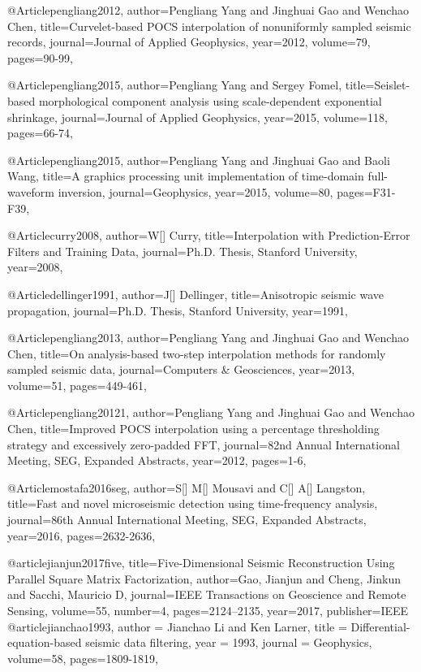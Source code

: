 {@Article{pengliang2012,
  author={Pengliang Yang and Jinghuai Gao and Wenchao Chen},
  title={Curvelet-based {POCS} interpolation of nonuniformly sampled seismic records},
  journal={Journal of Applied Geophysics},
  year=2012,
  volume=79,
  pages={90-99},
}

@Article{pengliang2015,
  author={Pengliang Yang and Sergey Fomel},
  title={Seislet-based morphological component analysis using scale-dependent exponential shrinkage},
  journal={Journal of Applied Geophysics},
  year=2015,
  volume=118,
  pages={66-74},
}

@Article{pengliang2015,
  author={Pengliang Yang and Jinghuai Gao and Baoli Wang},
  title={A graphics processing unit implementation of time-domain full-waveform inversion},
  journal={Geophysics},
  year=2015,
  volume=80,
  pages={F31-F39},
}

@Article{curry2008,
  author={W[] Curry},
  title={Interpolation with Prediction-Error Filters and Training Data},
  journal={Ph.D. Thesis, Stanford University},
  year=2008,
}

@Article{dellinger1991,
  author={J[] Dellinger},
  title={Anisotropic seismic wave propagation},
  journal={Ph.D. Thesis, Stanford University},
  year=1991,
}

@Article{pengliang2013,
  author={Pengliang Yang and Jinghuai Gao and Wenchao Chen},
  title={On analysis-based two-step interpolation methods for randomly sampled seismic data},
  journal={Computers \& Geosciences},
  year=2013,
  volume=51,
  pages={449-461},
}

@Article{pengliang20121,
  author={Pengliang Yang and Jinghuai Gao and Wenchao Chen},
  title={Improved {POCS} interpolation using a percentage thresholding strategy and excessively zero-padded FFT},
  journal={82nd Annual International Meeting, SEG, Expanded Abstracts},
  year=2012,
  pages={1-6},
}


@Article{mostafa2016seg,
  author={S[] M[] Mousavi and C[] A[] Langston},
  title={Fast and novel microseismic detection using time-frequency analysis},
  journal={86th Annual International Meeting, SEG, Expanded Abstracts},
  year=2016,
  pages={2632-2636},
}

@article{jianjun2017five,
  title={Five-Dimensional Seismic Reconstruction Using Parallel Square Matrix Factorization},
  author={Gao, Jianjun and Cheng, Jinkun and Sacchi, Mauricio D},
  journal={IEEE Transactions on Geoscience and Remote Sensing},
  volume={55},
  number={4},
  pages={2124--2135},
  year={2017},
  publisher={IEEE}
}
@article{jianchao1993,
  author =	 {Jianchao Li and Ken Larner},
  title =	 {Differential-equation-based seismic data filtering},
  year =	 1993,
  journal =	 {Geophysics},
  volume={58},
 pages=1809-1819,
}

}
